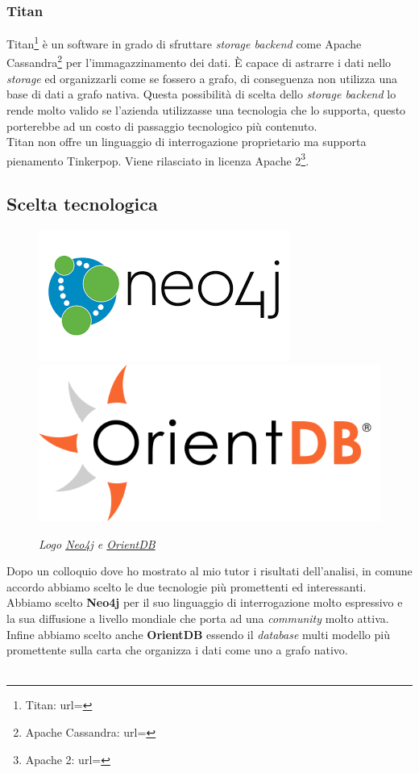\subsubsection{Titan}
Titan\footnote{Titan: url= } è un software in grado di sfruttare \textit{storage backend} come Apache Cassandra\footnote{Apache Cassandra: url= } per l'immagazzinamento dei dati. È capace di astrarre i dati nello \textit{storage} ed organizzarli come se fossero a grafo, di conseguenza non utilizza una base di dati a \gls{grafo nativa}.
Questa possibilità di scelta dello \textit{storage backend} lo rende molto valido se l'azienda utilizzasse una tecnologia che lo supporta, questo porterebbe ad un costo di passaggio tecnologico più contenuto.\\
Titan non offre un linguaggio di interrogazione proprietario ma supporta pienamento Tinkerpop.  Viene rilasciato in licenza Apache 2\footnote{Apache 2: url= }.
\subsection{Scelta tecnologica}
\begin{figure}[h!]
	\centering
	\includegraphics[scale=0.45]{immagini/neo4j.png}
	\includegraphics[scale=0.3]{immagini/orientdb.png}
	\caption{\textit{Logo \href{https://neo4j.com/}{Neo4j} e \href{http://orientdb.com/orientdb/}{OrientDB}}}
\end{figure}
Dopo un colloquio dove ho mostrato al mio tutor i risultati dell'analisi, in comune accordo abbiamo scelto le due tecnologie più promettenti ed interessanti.\\
Abbiamo scelto \textbf{Neo4j} per il suo linguaggio di interrogazione molto espressivo e la sua diffusione a livello mondiale che porta ad una \textit{community} molto attiva.\\
Infine abbiamo scelto anche \textbf{OrientDB} essendo il \textit{database} multi modello più promettente sulla carta che organizza i dati come uno a grafo nativo.
\\
\\

